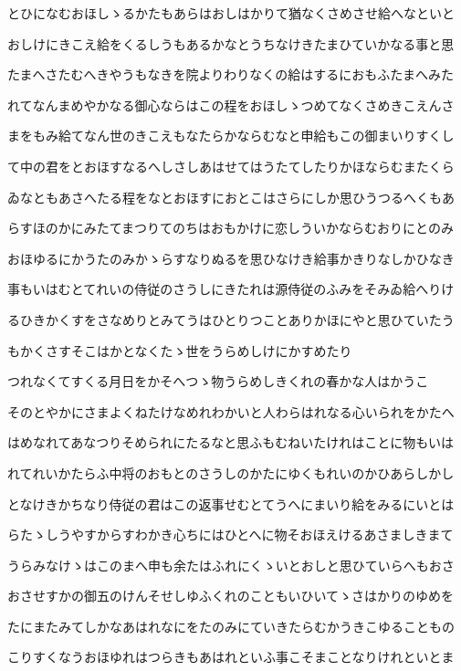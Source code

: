 \documentclass[a4paper,11pt,landscape]{ltjtarticle}
\begin{document}
とひになむおほしゝるかたもあらはおしはかりて猶なくさめさせ給へなといと
\par\medskip
おしけにきこえ給をくるしうもあるかなとうちなけきたまひていかなる事と思
\par\medskip
たまへさたむへきやうもなきを院よりわりなくの給はするにおもふたまへみた
\par\medskip
れてなんまめやかなる御心ならはこの程をおほしゝつめてなくさめきこえんさ
\par\medskip
まをもみ給てなん世のきこえもなたらかならむなと申給もこの御まいりすくし
\par\medskip
て中の君をとおほすなるへしさしあはせてはうたてしたりかほならむまたくら
\par\medskip
ゐなともあさへたる程をなとおほすにおとこはさらにしか思ひうつるへくもあ
\par\medskip
らすほのかにみたてまつりてのちはおもかけに恋しういかならむおりにとのみ
\par\medskip
おほゆるにかうたのみかゝらすなりぬるを思ひなけき給事かきりなしかひなき
\par\medskip
事もいはむとてれいの侍従のさうしにきたれは源侍従のふみをそみゐ給へりけ
\par\medskip
るひきかくすをさなめりとみてうはひとりつことありかほにやと思ひていたう
\par\medskip
もかくさすそこはかとなくたゝ世をうらめしけにかすめたり
\par\medskip
つれなくてすくる月日をかそへつゝ物うらめしきくれの春かな人はかうこ
\par\medskip
そのとやかにさまよくねたけなめれわかいと人わらはれなる心いられをかたへ
\par\medskip
はめなれてあなつりそめられにたるなと思ふもむねいたけれはことに物もいは
\par\medskip
れてれいかたらふ中将のおもとのさうしのかたにゆくもれいのかひあらしかし
\par\medskip
となけきかちなり侍従の君はこの返事せむとてうへにまいり給をみるにいとは
\par\medskip
らたゝしうやすからすわかき心ちにはひとへに物そおほえけるあさましきまて
\par\medskip
うらみなけゝはこのまへ申も余たはふれにくゝいとおしと思ひていらへもおさ
\par\medskip
おさせすかの御五のけんそせしゆふくれのこともいひいてゝさはかりのゆめを
\par\medskip
たにまたみてしかなあはれなにをたのみにていきたらむかうきこゆることもの
\par\medskip
こりすくなうおほゆれはつらきもあはれといふ事こそまことなりけれといとま
\end{document}
